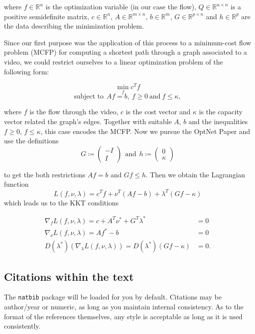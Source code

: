 \documentclass{article}
\begin{document}
where $f\in \mathbb{R}^n$ is the optimization variable (in our case the flow), $Q\in \mathbb{R}^{n\times n}$ is a positive semidefinite matrix, $c\in \mathbb{R}^n$, $A\in \mathbb{R}^{m\times n}$, $b\in \mathbb{R}^m$, $G\in \mathbb{R}^{p\times n}$ and $h\in \mathbb{R}^p$ are the data describing the minimization problem. 

Since our first purpose was the application of this process to a minimum-cost flow problem (MCFP) for computing a shortest path through a graph associated to a video, we could restrict ourselves to a linear optimization problem of the following form:

\[\min_f c^T f\] 
\[ \text{subject to} ~~Af=b,~f\geq 0 ~\text{and}~ f \leq \kappa,\]

where $f$ is the flow through the video, $c$ is the cost vector and $\kappa$ is the capacity vector related the graph's edges. Together with suitable $A$, $b$ and the inequalities $f\geq 0$, $f\leq \kappa$, this case encodes the MCFP. Now we pursue the OptNet Paper and use the definitions
\[G\coloneqq \begin{pmatrix} -I \\  I \end{pmatrix} ~~\text{and} ~~ h\coloneqq \begin{pmatrix} 0 \\ \kappa \end{pmatrix} \]

to get the both restrictions $Af=b$ and $Gf\leq h$. Then we obtain the Lagrangian function
\[L(f, \nu, \lambda) = c^T f + \nu ^T (Af-b) + \lambda^T(Gf-\kappa)\]
which leads us to the KKT conditions

\begin{align*}
\nabla_f L(f,\nu, \lambda) = c + A^T \nu^*  + G^T\lambda^* &= 0 \\
\nabla _\nu L(f, \nu, \lambda) = Af^* - b &= 0 \\
D(\lambda^*) (\nabla_\lambda L(f, \nu, \lambda)) = D(\lambda^*)(Gf-\kappa) &= 0.
\end{align*}




\subsection{Citations within the text}

The \verb+natbib+ package will be loaded for you by default.
Citations may be author/year or numeric, as long as you maintain
internal consistency.  As to the format of the references themselves,
any style is acceptable as long as it is used consistently.
\end{document}
